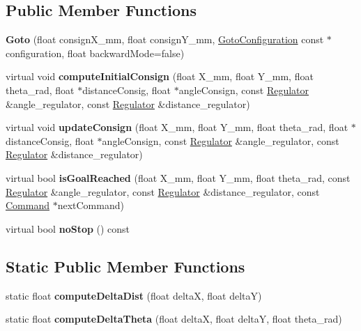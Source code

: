 \subsection*{Public Member Functions}
\begin{DoxyCompactItemize}
\item 
\mbox{\label{classGoto_afbf185c764d963a96c32fdca709ebb6e}} 
{\bfseries Goto} (float consign\+X\+\_\+mm, float consign\+Y\+\_\+mm, \hyperlink{structGoto_1_1GotoConfiguration}{Goto\+Configuration} const $\ast$configuration, float backward\+Mode=false)
\item 
\mbox{\label{classGoto_a8b7770cfbe996d43e312a22576817a12}} 
virtual void {\bfseries compute\+Initial\+Consign} (float X\+\_\+mm, float Y\+\_\+mm, float theta\+\_\+rad, float $\ast$distance\+Consig, float $\ast$angle\+Consign, const \hyperlink{classRegulator}{Regulator} \&angle\+\_\+regulator, const \hyperlink{classRegulator}{Regulator} \&distance\+\_\+regulator)
\item 
\mbox{\label{classGoto_abe5732a3f70668e07bbb9363b537e2b4}} 
virtual void {\bfseries update\+Consign} (float X\+\_\+mm, float Y\+\_\+mm, float theta\+\_\+rad, float $\ast$distance\+Consig, float $\ast$angle\+Consign, const \hyperlink{classRegulator}{Regulator} \&angle\+\_\+regulator, const \hyperlink{classRegulator}{Regulator} \&distance\+\_\+regulator)
\item 
\mbox{\label{classGoto_a9251ad78adca0b3e9358346d3bf90ad0}} 
virtual bool {\bfseries is\+Goal\+Reached} (float X\+\_\+mm, float Y\+\_\+mm, float theta\+\_\+rad, const \hyperlink{classRegulator}{Regulator} \&angle\+\_\+regulator, const \hyperlink{classRegulator}{Regulator} \&distance\+\_\+regulator, const \hyperlink{classCommand}{Command} $\ast$next\+Command)
\item 
\mbox{\label{classGoto_a6896a408afe83ab037f6fe9c4a596358}} 
virtual bool {\bfseries no\+Stop} () const
\end{DoxyCompactItemize}
\subsection*{Static Public Member Functions}
\begin{DoxyCompactItemize}
\item 
\mbox{\label{classGoto_a40f2209d86b38d1ed8a2660e16868f4d}} 
static float {\bfseries compute\+Delta\+Dist} (float deltaX, float deltaY)
\item 
\mbox{\label{classGoto_aa38fb0a34b86a9ee4924aabfffe1c96f}} 
static float {\bfseries compute\+Delta\+Theta} (float deltaX, float deltaY, float theta\+\_\+rad)
\end{DoxyCompactItemize}


